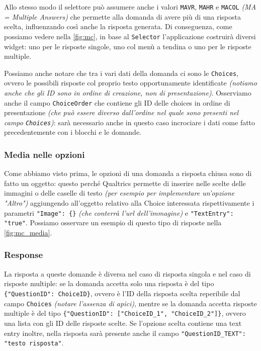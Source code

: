 Allo stesso modo il selettore può assumere anche i valori \texttt{MAVR}, \texttt{MAHR} e \texttt{MACOL} \textit{(MA = Multiple Answers)} che permette alla domanda di avere più di una risposta scelta, influenzando così anche la risposta generata. Di conseguenza, come possiamo vedere nella \autoref{fig:mc}, in base al \texttt{Selector} l'applicazione costruirà diversi widget: uno per le risposte singole, uno col menù a tendina o uno per le risposte multiple.

Possiamo anche notare che tra i vari dati della domanda ci sono le \texttt{Choices}, ovvero le possibili risposte col proprio testo opportunamente identificate \textit{(notiamo anche che gli ID sono in ordine di creazione, non di presentazione)}. Osserviamo anche il campo \texttt{ChoiceOrder} che contiene gli ID delle choices in ordine di presentazione \textit{(che può essere diverso dall'ordine nel quale sono presenti nel campo \texttt{Choices})}: sarà necessario anche in questo caso incrociare i dati come fatto precedentemente con i blocchi e le domande.

\subsubsection{Media nelle opzioni}
Come abbiamo visto prima, le opzioni di una domanda a risposta chiusa sono di fatto un oggetto: questo perché Qualtrics permette di inserire nelle scelte delle immagini o delle caselle di testo \textit{(per esempio per implementare un'opzione "Altro")} aggiungendo all'oggetto relativo alla Choice interessata rispettivamente i parametri \texttt{"Image": \{\}} \textit{(che conterrà l'url dell'immagine)} e \texttt{"TextEntry": "true"}.
Possiamo osservare un esempio di questo tipo di risposte nella \autoref{fig:mc_media}.

\subsubsection{Response}
La risposta a queste domande è diversa nel caso di risposta singola e nel caso di risposte multiple: se la domanda accetta solo una risposta è del tipo \texttt{\{"QuestionID": ChoiceID\}}, ovvero è l'ID della risposta scelta reperibile dal campo \texttt{Choices} \textit{(notare l'assenza di apici)}, mentre se la domanda accetta risposte multiple è del tipo \texttt{\{"QuestionID": ["ChoiceID\_1", "ChoiceID\_2"]\}}, ovvero una lista con gli ID delle risposte scelte. Se l'opzione scelta contiene una text entry inoltre, nella risposta sarà presente anche il campo \texttt{"QuestionID\_TEXT": "testo risposta"}.

